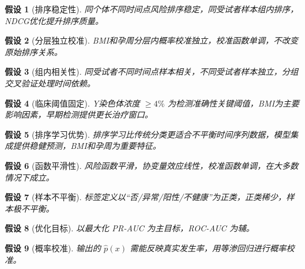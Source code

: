 \documentclass[12pt,a4paper]{ctexart}
\numberwithin{equation}{section}
\theoremstyle{mcm}
\newtheorem{assump}{假设}[section]
\begin{document}
\begin{assump}[排序稳定性]
同个体不同时间点风险排序稳定，同受试者样本组内排序，NDCG优化提升排序质量。
\end{assump}
\begin{assump}[分层独立校准]
BMI和孕周分层内概率校准独立，校准函数单调，不改变原始排序关系。
\end{assump}
\begin{assump}[组内相关性]
同受试者不同时间点样本相关，不同受试者样本独立，分组交叉验证处理时间依赖。
\end{assump}
\begin{assump}[临床阈值固定]
 Y染色体浓度 \( \geq 4\% \) 为检测准确性关键阈值，BMI为主要影响因素，早期检测提供更长治疗窗口。
\end{assump}
\begin{assump}[排序学习优势]
排序学习比传统分类更适合不平衡时间序列数据，模型集成提供稳健预测，BMI和孕周为重要特征。
\end{assump}
\begin{assump}[函数平滑性]
风险函数平滑，协变量效应线性，校准函数单调，在大多数情况下成立。
\end{assump}
\begin{assump}[样本不平衡]
标签定义以“否/异常/阳性/不健康”为正类，正类稀少，样本极不平衡。
\end{assump}
\begin{assump}[优化目标]
以最大化 PR-AUC 为主目标，ROC-AUC 为辅。
\end{assump}
\begin{assump}[概率校准]
输出的 \( \hat{p}(x) \) 需能反映真实发生率，用等渗回归进行概率校准。
\end{assump}


\end{document}
